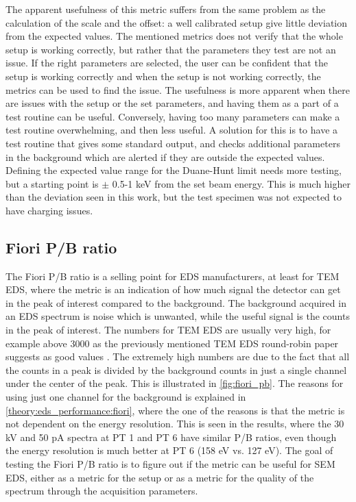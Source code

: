 The apparent usefulness of this metric suffers from the same problem as the calculation of the scale and the offset: a well calibrated setup give little deviation from the expected values.
The mentioned metrics does not verify that the whole setup is working correctly, but rather that the parameters they test are not an issue.
If the right parameters are selected, the user can be confident that the setup is working correctly and when the setup is not working correctly, the metrics can be used to find the issue.
The usefulness is more apparent when there are issues with the setup or the set parameters, and having them as a part of a test routine can be useful.
Conversely, having too many parameters can make a test routine overwhelming, and then less useful.
A solution for this is to have a test routine that gives some standard output, and checks additional parameters in the background which are alerted if they are outside the expected values.
Defining the expected value range for the Duane-Hunt limit needs more testing, but a starting point is $\pm$ 0.5-1 keV from the set beam energy.
This is much higher than the deviation seen in this work, but the test specimen was not expected to have charging issues.




\subsection{Fiori P/B ratio}
\label{discussion:fiori_peak_to_background_ratio}

The Fiori P/B ratio is a selling point for EDS manufacturers, at least for TEM EDS, where the metric is an indication of how much signal the detector can get in the peak of interest compared to the background.
The background acquired in an EDS spectrum is noise which is unwanted, while the useful signal is the counts in the peak of interest.
The numbers for TEM EDS are usually very high, for example above 3000 as the previously mentioned TEM EDS round-robin paper suggests as good values \cite{bennett_egerton_1995,ted_pella_nio_tem_2019}.
The extremely high numbers are due to the fact that all the counts in a peak is divided by the background counts in just a single channel under the center of the peak.
This is illustrated in \cref{fig:fiori_pb}.
The reasons for using just one channel for the background is explained in \cref{theory:eds_performance:fiori}, where the one of the reasons is that the metric is not dependent on the energy resolution.
This is seen in the results, where the 30 kV and 50 pA spectra at PT 1 and PT 6 have similar P/B ratios, even though the energy resolution is much better at PT 6 (158 eV vs. 127 eV).
The goal of testing the Fiori P/B ratio is to figure out if the metric can be useful for SEM EDS, either as a metric for the setup or as a metric for the quality of the spectrum through the acquisition parameters.


